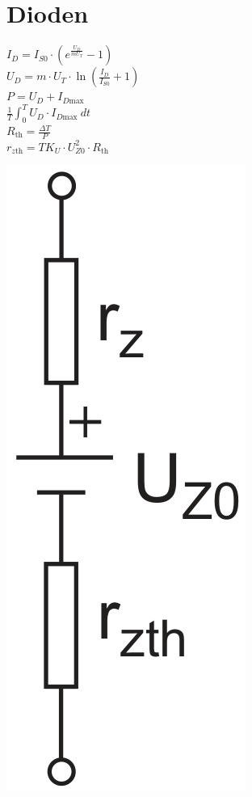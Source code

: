 \documentclass[a5paper, 12pt, twoside]{scrartcl}
\begin{document}
\section{Dioden}

\begin{minipage}{.69\linewidth}
  \dotfill\(I_D = I_{S0} \cdot \left( e^{\frac{U_D}{mU_T}}-1 \right)\)\\[1em]
  \dotfill\(U_D = m \cdot U_T \cdot \ln\left(\frac{I_D}{I_{S0}} + 1\right)\)\\[1em]
  \dotfill\(P = U_D + I_{D\text{max}}\)\\[1em]
  \dotfill\(\frac{1}{T} \int_0^T U_D \cdot I_{D\text{max}}\ dt\)\\[1em]
  \dotfill\(R_{\text{th}} = \frac{\Delta T}{P}\)\\[1em]
  \dotfill\(r_{z\text{th}} = TK_U \cdot U^2_{Z0} \cdot R_{\text{th}}\)
\end{minipage}\hfill%
\begin{minipage}{.29\linewidth}
  {\centering
    \includegraphics[width=.4\textwidth]{ESB_ZDiode}
    \par
  }
\end{minipage}
\end{document}
